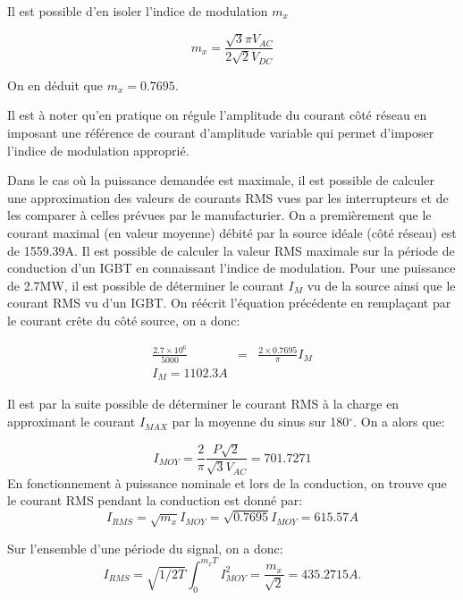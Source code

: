 Il est possible d'en isoler l'indice de modulation $m_x$

\begin{equation}
m_x = \frac{\sqrt{3}\pi V_{AC}}{2\sqrt{2}V_{DC}}
\end{equation}

On en déduit que $m_x = 0.7695$. 

Il est à noter qu'en pratique on régule l'amplitude du courant côté réseau en imposant une référence de courant d'amplitude variable qui permet d'imposer l'indice de modulation approprié.

Dans le cas où la puissance demandée est maximale, il est possible de calculer une approximation des valeurs de courants RMS vues par les interrupteurs et de les comparer à celles prévues par le manufacturier. On a premièrement que le courant maximal (en valeur moyenne) débité par la source idéale (côté réseau) est de 1559.39A. Il est possible de calculer la valeur RMS maximale sur la période de conduction d'un IGBT en connaissant l'indice de modulation.  Pour une puissance de 2.7MW, il est possible de déterminer le courant $I_M$ vu de la source ainsi que le courant RMS vu d'un IGBT. On réécrit l'équation précédente en remplaçant par le courant crête du côté source, on a donc:

\begin{eqnarray}
\frac{2.7\times 10^6}{5000} &=& \frac{2 \times 0.7695}{\pi} I_M\\
I_M = 1102.3A
\end{eqnarray}

Il est par la suite possible de déterminer le courant RMS à la charge en approximant le courant $I_{MAX}$ par la moyenne du sinus sur 180$^\circ$. On a alors que:

\begin{equation}
I_{MOY} = \frac{2}{\pi} \frac{P\sqrt{2}}{\sqrt{3}V_{AC}} = 701.7271
\end{equation}
En fonctionnement à puissance nominale et lors de la conduction, on trouve que le courant RMS pendant la conduction est donné par:
\begin{equation}
I_{RMS} =  \sqrt{m_x}I_{MOY} = \sqrt{0.7695}I_{MOY} = 615.57A
\end{equation}

Sur l'ensemble d'une période du signal, on a donc:
\begin{equation}
I_{RMS} =  \sqrt{1/2T}\int_0^{m_xT} I_{MOY}^2 = \frac{m_x}{\sqrt{2}}= 435.2715A.
\end{equation}

